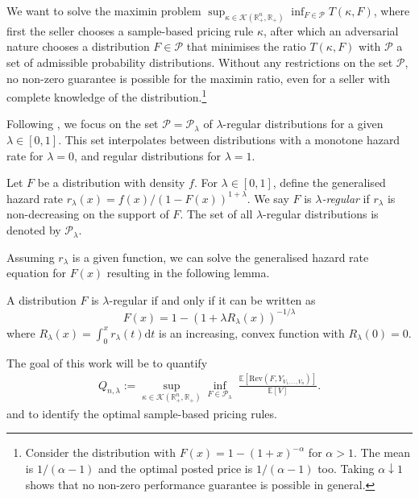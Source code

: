 \documentclass[11pt]{article}
\newcommand{\E}{\mathbb{E}}
\newcommand{\Rplus}{\mathbb{R}_+}
\newcommand{\dd}{\mathrm{d}}
\newcommand{\Rev}{\mathrm{Rev}}
\begin{document}
We want to solve the maximin problem 
$
\sup_{\kappa\in \mathcal{K}(\Rplus^n,\Rplus)}\inf_{F\in\mathcal{P}} T(\kappa,F)$,
where first the seller chooses a sample-based pricing rule $\kappa$, after which an adversarial nature  chooses a distribution $F \in \mathcal{P}$ that minimises the ratio $T(\kappa,F)$ with $\mathcal{P}$ a set of admissible probability distributions. Without any restrictions on the set $\mathcal{P}$, no non-zero guarantee is possible for the maximin ratio, even for a seller with complete knowledge of the distribution.\footnote{Consider the distribution with $F(x)=1-(1+x)^{-\alpha}$ for $\alpha > 1$. The mean is $1/(\alpha-1)$ and the optimal posted price is $1/(\alpha-1)$ too. Taking $\alpha\downarrow 1$ shows that no non-zero performance guarantee is possible in general.}

Following \cite{allouah2022pricing}, we focus on the set $\mathcal{P} = \mathcal{P}_{\lambda}$ of $\lambda$-regular distributions for a given $\lambda \in [0,1]$. This set interpolates between distributions with a monotone hazard rate for $\lambda=0$, and regular distributions for $\lambda=1$.


\begin{definition}
	Let $F$ be a distribution with density $f$. For $\lambda\in[0,1]$, define the generalised hazard rate $r_\lambda(x)=f(x)/(1-F(x))^{1+\lambda}$. We say $F$ is \emph{$\lambda$-regular} if $r_\lambda$ is non-decreasing on the support of $F$. The set of all $\lambda$-regular distributions is denoted by $\mathcal{P}_\lambda$.
\end{definition}

Assuming $r_{\lambda}$ is a given function, we can solve the generalised hazard rate equation for $F(x)$ resulting in the following lemma.

\begin{lemma}
    A distribution $F$ is $\lambda$-regular if and only if it can be written as
    $$
    F(x) = 1-\left(1+\lambda R_\lambda(x)\right)^{-1/\lambda}
    $$
     where $R_\lambda(x)=\int_0^xr_\lambda(t)\dd t$ is an increasing, convex function with $R_{\lambda}(0) = 0$.
\end{lemma}

The goal of this work will be to  quantify
\begin{align}
Q_{n,\lambda} :=\sup_{\kappa\in \mathcal{K}(\Rplus^n,\Rplus)}\inf_{F\in\mathcal{P}_{\lambda}} \; \frac{\E[\Rev(F,Y_{V_1,\dots,V_n})]}{\E[V]}.
    \label{ref:main_ratio_lambda}
\end{align}
and to identify the optimal sample-based pricing rules.
\end{document}
